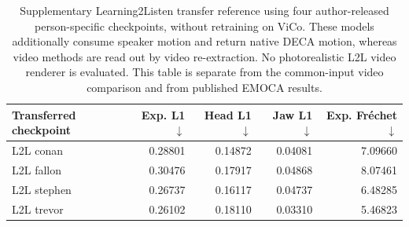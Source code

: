 \begin{table}[t]
\centering\small
\caption{Supplementary Learning2Listen transfer reference using four author-released person-specific checkpoints, without retraining on ViCo. These models additionally consume speaker motion and return native DECA motion, whereas video methods are read out by video re-extraction. No photorealistic L2L video renderer is evaluated. This table is separate from the common-input video comparison and from published EMOCA results.}
\label{tab:vico43-l2l-transfer}
\setlength{\tabcolsep}{4pt}
\begin{tabular}{lrrrr}
\toprule
Transferred checkpoint & Exp. L1 $\downarrow$ & Head L1 $\downarrow$ & Jaw L1 $\downarrow$ & Exp. Fr\'{e}chet $\downarrow$ \\
\midrule
L2L conan & 0.28801 & 0.14872 & 0.04081 & 7.09660 \\
L2L fallon & 0.30476 & 0.17917 & 0.04868 & 8.07461 \\
L2L stephen & 0.26737 & 0.16117 & 0.04737 & 6.48285 \\
L2L trevor & 0.26102 & 0.18110 & 0.03310 & 5.46823 \\
\bottomrule
\end{tabular}
\end{table}
